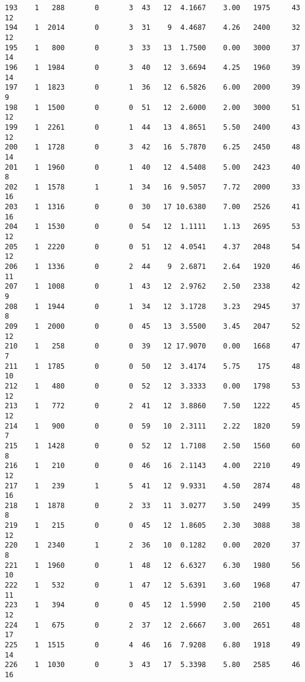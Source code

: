 \documentclass[
  letterpaper,
  DIV=11,
  numbers=noendperiod]{scrreprt}
\begin{document}
\begin{verbatim}
193    1   288       0       3  43   12  4.1667    3.00   1975     43      12
194    1  2014       0       3  31    9  4.4687    4.26   2400     32      12
195    1   800       0       3  33   13  1.7500    0.00   3000     37      14
196    1  1984       0       3  40   12  3.6694    4.25   1960     39      14
197    1  1823       0       1  36   12  6.5826    6.00   2000     39       9
198    1  1500       0       0  51   12  2.6000    2.00   3000     51      12
199    1  2261       0       1  44   13  4.8651    5.50   2400     43      12
200    1  1728       0       3  42   16  5.7870    6.25   2450     48      14
201    1  1960       0       1  40   12  4.5408    5.00   2423     40       8
202    1  1578       1       1  34   16  9.5057    7.72   2000     33      16
203    1  1316       0       0  30   17 10.6380    7.00   2526     41      16
204    1  1530       0       0  54   12  1.1111    1.13   2695     53      12
205    1  2220       0       0  51   12  4.0541    4.37   2048     54      12
206    1  1336       0       2  44    9  2.6871    2.64   1920     46      11
207    1  1008       0       1  43   12  2.9762    2.50   2338     42       9
208    1  1944       0       1  34   12  3.1728    3.23   2945     37       8
209    1  2000       0       0  45   13  3.5500    3.45   2047     52      12
210    1   258       0       0  39   12 17.9070    0.00   1668     47       7
211    1  1785       0       0  50   12  3.4174    5.75    175     48      10
212    1   480       0       0  52   12  3.3333    0.00   1798     53      12
213    1   772       0       2  41   12  3.8860    7.50   1222     45      12
214    1   900       0       0  59   10  2.3111    2.22   1820     59       7
215    1  1428       0       0  52   12  1.7108    2.50   1560     60       8
216    1   210       0       0  46   16  2.1143    4.00   2210     49      12
217    1   239       1       5  41   12  9.9331    4.50   2874     48      16
218    1  1878       0       2  33   11  3.0277    3.50   2499     35       8
219    1   215       0       0  45   12  1.8605    2.30   3088     38      12
220    1  2340       1       2  36   10  0.1282    0.00   2020     37       8
221    1  1960       0       1  48   12  6.6327    6.30   1980     56      10
222    1   532       0       1  47   12  5.6391    3.60   1968     47      11
223    1   394       0       0  45   12  1.5990    2.50   2100     45      12
224    1   675       0       2  37   12  2.6667    3.00   2651     48      17
225    1  1515       0       4  46   16  7.9208    6.80   1918     49      14
226    1  1030       0       3  43   17  5.3398    5.80   2585     46      16

\end{verbatim}
\end{document}
